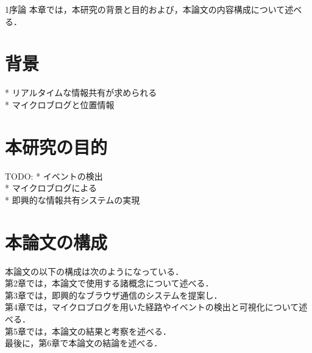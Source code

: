 \chapterhead
{1}{序論}
{本章では，本研究の背景と目的および，本論文の内容構成について述べる．}

\section{背景}

* リアルタイムな情報共有が求められる\\
* マイクロブログと位置情報\\


\newpage

\section{本研究の目的}
TODO:
* イベントの検出 \\
* マイクロブログによる \\
* 即興的な情報共有システムの実現

\newpage

\section{本論文の構成}
本論文の以下の構成は次のようになっている．\\
第2章では，本論文で使用する諸概念について述べる．\\
第3章では，即興的なブラウザ通信のシステムを提案し．\\
第4章では，マイクロブログを用いた経路やイベントの検出と可視化について述べる．\\
第5章では，本論文の結果と考察を述べる．\\
最後に，第6章で本論文の結論を述べる．\\
